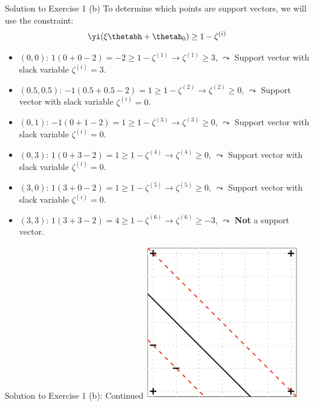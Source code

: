 \documentclass[aspectratio=169]{beamer}
\newcommand{\zetai}{\zeta^{(i)}}
\begin{document}
\begin{frame}{Solution to Exercise 1 (b)}
	To determine which points are support vectors, we will use the constraint:
	\begin{align*}
		\yi (\xi \thetabh + \thetah_0) \geq 1 - \zetai 
	\end{align*}
	
	\begin{itemize}
		\item<2-> $(0,0)$: $1 (0 + 0 - 2) = -2 \geq 1 - \zeta^{(1)} \rightarrow \zeta^{(1)} \geq 3$, $\leadsto$ Support vector with slack variable $\zetai = 3$.
		\item<3-> $(0.5, 0.5)$: $-1 (0.5 + 0.5 - 2) = 1 \geq 1 - \zeta^{(2)} \rightarrow \zeta^{(2)} \geq 0$, $\leadsto$ Support vector with slack variable $\zetai = 0 $.
		\item<4-> $(0, 1)$: $ -1 (0 + 1 - 2) = 1 \geq 1 - \zeta^{(3)} \rightarrow \zeta^{(3)} \geq 0$, $\leadsto$ Support vector with slack variable $\zetai = 0$.
		\item<5-> $(0, 3)$: $ 1 (0 + 3 - 2) = 1 \geq 1 - \zeta^{(4)} \rightarrow \zeta^{(4)} \geq 0$, $\leadsto$ Support vector with slack variable $\zetai = 0$.
		\item<6-> $(3, 0)$: $ 1 (3 + 0 - 2) = 1 \geq 1 - \zeta^{(5)} \rightarrow \zeta^{(5)} \geq 0$, $\leadsto$ Support vector with slack variable $\zetai = 0$.
		\item<7-> $(3, 3)$: $ 1 (3 + 3 - 2) = 4 \geq 1 - \zeta^{(6)} \rightarrow \zeta^{(6)} \geq -3 $, $\leadsto$ \textbf{Not} a support vector.
	\end{itemize}
\end{frame}

\begin{frame}{Solution to Exercise 1 (b): Continued}
	\centering
	\includegraphics[width=0.5\textwidth]{figures/ex_1_b.png}
\end{frame}
\end{document}
